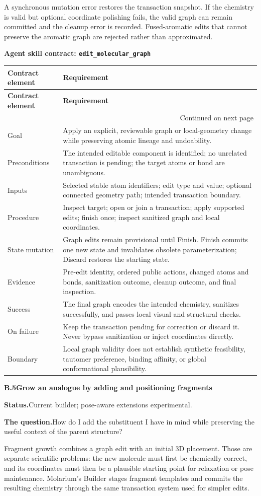 \documentclass[10pt,letterpaper]{article}
\makeatletter
\newcommand{\code}[1]{\texttt{#1}}
\newcommand{\lead}[1]{\textbf{#1}\hspace{0.35em}}
\newcommand{\workflowsection}[4]{%
  \par\needspace{5\baselineskip}\vspace{7.5pt}%
  {\fontsize{10.91}{13.1}\selectfont\bfseries #1\hspace{1.1em}#2}\par\vspace{2pt}%
  \lead{Status.}#3.\par\vspace{-3.5pt}%
  \lead{The question.}#4\par}
\newenvironment{skillcontract}[1]{%
  \par\needspace{5\baselineskip}\vspace{2pt}%
  {\fontsize{10.91}{13.1}\selectfont\bfseries Agent skill contract: \code{#1}}\par\vspace{1pt}%
  \fontsize{8.4}{10}\selectfont
  \begin{longtable}{@{}K V@{}}
  \toprule
  \textbf{Contract element} & \textbf{Requirement}\\
  \midrule
  \endfirsthead
  \toprule
  \textbf{Contract element} & \textbf{Requirement}\\
  \midrule
  \endhead
  \midrule
  \multicolumn{2}{r}{\footnotesize Continued on next page}\\
  \endfoot
  \bottomrule
  \endlastfoot
}{%
  \end{longtable}
  \normalsize\fontsize{9.96}{11.95}\selectfont}
\newcommand{\contractrow}[2]{#1 & #2\\}
\makeatother
\begin{document}
A synchronous mutation error restores the transaction snapshot. If the chemistry is valid but optional coordinate polishing fails, the valid graph can remain committed and the cleanup error is recorded. Fused-aromatic edits that cannot preserve the aromatic graph are rejected rather than approximated.

\begin{skillcontract}{edit\_molecular\_graph}
\contractrow{Goal}{Apply an explicit, reviewable graph or local-geometry change while preserving atomic lineage and undoability.}
\contractrow{Preconditions}{The intended editable component is identified; no unrelated transaction is pending; the target atoms or bond are unambiguous.}
\contractrow{Inputs}{Selected stable atom identifiers; edit type and value; optional connected geometry path; intended transaction boundary.}
\contractrow{Procedure}{Inspect target; open or join a transaction; apply supported edits; finish once; inspect sanitized graph and local coordinates.}
\contractrow{State mutation}{Graph edits remain provisional until Finish. Finish commits one new state and invalidates obsolete parameterization; Discard restores the starting state.}
\contractrow{Evidence}{Pre-edit identity, ordered public actions, changed atoms and bonds, sanitization outcome, cleanup outcome, and final inspection.}
\contractrow{Success}{The final graph encodes the intended chemistry, sanitizes successfully, and passes local visual and structural checks.}
\contractrow{On failure}{Keep the transaction pending for correction or discard it. Never bypass sanitization or inject coordinates directly.}
\contractrow{Boundary}{Local graph validity does not establish synthetic feasibility, tautomer preference, binding affinity, or global conformational plausibility.}
\end{skillcontract}

\workflowsection{B.5}{Grow an analogue by adding and positioning fragments}{Current builder; pose-aware extensions experimental}{How do I add the substituent I have in mind while preserving the useful context of the parent structure?}

Fragment growth combines a graph edit with an initial 3D placement. Those are separate scientific problems: the new molecule must first be chemically correct, and its coordinates must then be a plausible starting point for relaxation or pose maintenance. Molarium's Builder stages fragment templates and commits the resulting chemistry through the same transaction system used for simpler edits.
\end{document}
